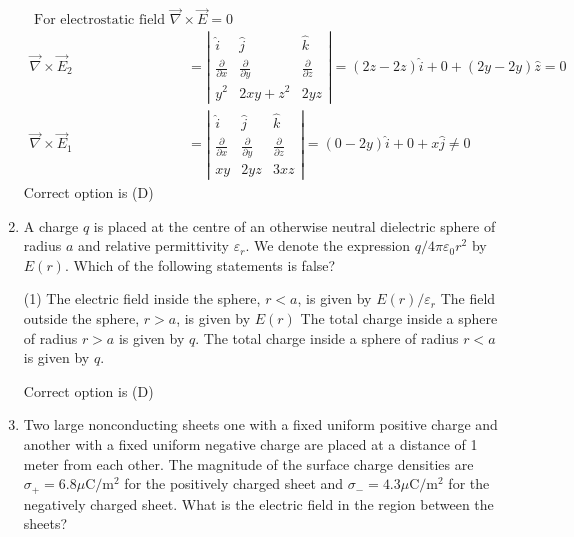 \begin{enumerate}[label=\color{ocre}\textbf{\arabic*.}]
\begin{answer}
\begin{align*}
\text { For electrostatic field } \vec{\nabla} \times \vec{E}=0\\
\vec{\nabla} \times \vec{E}_{2}&=\left|\begin{array}{ccc}
\hat{i} & \hat{j} & \hat{k} \\
\frac{\partial}{\partial x} & \frac{\partial}{\partial y} & \frac{\partial}{\partial z} \\
y^{2} & 2 x y+z^{2} & 2 y z
\end{array}\right|=
(2 z-2 z) \hat{i}+0+(2 y-2 y) \hat{z}=0\\
\vec{\nabla} \times \vec{E}_{1}&=\left|\begin{array}{ccc}
\hat{i} & \hat{j} & \hat{k} \\
\frac{\partial}{\partial x} & \frac{\partial}{\partial y} & \frac{\partial}{\partial z} \\
x y & 2 y z & 3 x z
\end{array}\right|=(0-2 y) \hat{i}+0+x \hat{j} \neq 0
\end{align*}
Correct option is (D)
\end{answer}
\item A charge $q$ is placed at the centre of an otherwise neutral dielectric sphere of radius $a$
and relative permittivity $\varepsilon_{r} .$ We denote the expression $q / 4 \pi \varepsilon_{0} r^{2}$ by $E(r)$. Which of the
following statements is false?
{}
\begin{tasks}(1)
\task[\textbf{A.}] The electric field inside the sphere, $r<a$, is given by $E(r) / \varepsilon_{r}$
\task[\textbf{B.}] The field outside the sphere, $r>a$, is given by $E(r)$
\task[\textbf{C.}]The total charge inside a sphere of radius $r>a$ is given by $q$.
\task[\textbf{D.}]The total charge inside a sphere of radius $r<a$ is given by $q$. 
\end{tasks}
\begin{answer}
Correct option is (D)
\end{answer}
\item Two large nonconducting sheets one with a fixed uniform positive charge and another
with a fixed uniform negative charge are placed at a distance of 1 meter from each other.
The magnitude of the surface charge densities are $\sigma_{+}=6.8 \mu \mathrm{C} / \mathrm{m}^{2}$ for the positively
charged sheet and $\sigma_{-}=4.3 \mu \mathrm{C} / \mathrm{m}^{2}$ for the negatively charged sheet. What is the electric
field in the region between the sheets?

\end{enumerate}
